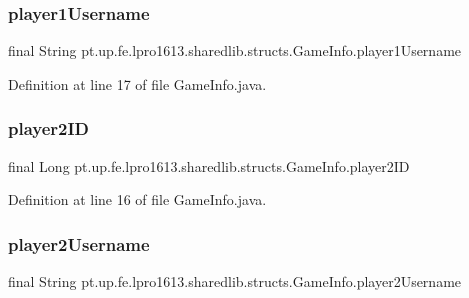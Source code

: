 \subsubsection{\texorpdfstring{player1\+Username}{player1Username}}
{\footnotesize\ttfamily final String pt.\+up.\+fe.\+lpro1613.\+sharedlib.\+structs.\+Game\+Info.\+player1\+Username}



Definition at line 17 of file Game\+Info.\+java.

\hypertarget{classpt_1_1up_1_1fe_1_1lpro1613_1_1sharedlib_1_1structs_1_1_game_info_a0f84cb7487202f0602d6df2b2291985c}{}\label{classpt_1_1up_1_1fe_1_1lpro1613_1_1sharedlib_1_1structs_1_1_game_info_a0f84cb7487202f0602d6df2b2291985c} 
\subsubsection{\texorpdfstring{player2\+ID}{player2ID}}
{\footnotesize\ttfamily final Long pt.\+up.\+fe.\+lpro1613.\+sharedlib.\+structs.\+Game\+Info.\+player2\+ID}



Definition at line 16 of file Game\+Info.\+java.

\hypertarget{classpt_1_1up_1_1fe_1_1lpro1613_1_1sharedlib_1_1structs_1_1_game_info_a39ad9d8b40f68dc569b9ff0c9a3a526e}{}\label{classpt_1_1up_1_1fe_1_1lpro1613_1_1sharedlib_1_1structs_1_1_game_info_a39ad9d8b40f68dc569b9ff0c9a3a526e} 
\subsubsection{\texorpdfstring{player2\+Username}{player2Username}}
{\footnotesize\ttfamily final String pt.\+up.\+fe.\+lpro1613.\+sharedlib.\+structs.\+Game\+Info.\+player2\+Username}




